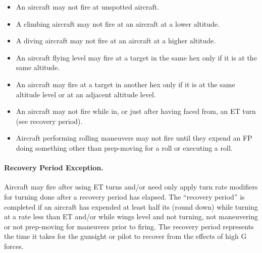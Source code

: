 \begin{itemize}
    \item An aircraft may not fire at unspotted aircraft.
    \item A climbing aircraft may not fire at an aircraft at a lower altitude.
    \item A diving aircraft may not fire at an aircraft at a higher altitude.
    \item An aircraft flying level may fire at a target in the same hex only if it is at the same altitude.
    \item An aircraft  may fire at a target in another hex only if it is at the same altitude level or at an adjacent altitude level.
    \item An aircraft may not fire while in, or just after having faced from, an ET turn (see recovery period).
    \item Aircraft performing rolling maneuvers may not fire until they expend an FP doing something other than prep-moving for a roll or executing a roll.
\end{itemize}


\paragraph{Recovery Period Exception.} Aircraft may fire after using ET turns and/or need only apply turn rate modifiers for turning done after a recovery period has elapsed. The “recovery period” is completed if an aircraft has expended at least half its  (round down) while turning at a rate less than ET and/or while wings level and not turning, not maneuvering or not prep-moving for maneuvers prior to firing. The recovery period represents the time it takes for the gunsight or pilot to recover from the effects of high G forces. 

